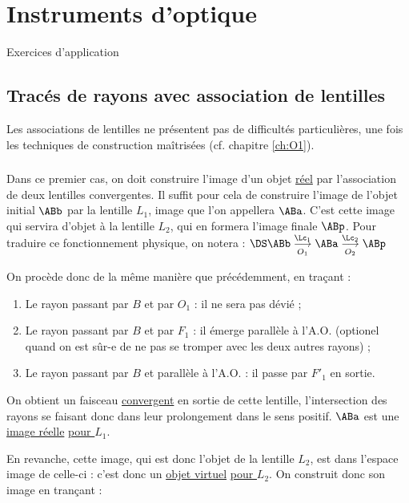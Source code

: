 \documentclass[../main/main.tex]{subfiles}
\begin{document}
\chapter{Instruments d'optique}
\vspace*{-47pt}
\begin{center}
    \Huge Exercices d'application
\end{center}
\section{Tracés de rayons avec association de lentilles}
Les associations de lentilles ne présentent pas de difficultés particulières,
une fois les techniques de construction maîtrisées (cf. chapitre \ref{ch:O1}).

\subsection{}
Dans ce premier cas, on doit construire l'image d'un objet \underline{réel} par
l'association de deux lentilles convergentes. Il suffit pour cela de construire
l'image de l'objet initial $\ABb$ par la lentille $L_1$, image que l'on appellera
$\ABa$. C'est cette image qui servira d'objet à la lentille $L_2$, qui en
formera l'image finale $\ABp$. Pour traduire ce fonctionnement physique, on
notera : $\DS \ABb \underset{O_1}{\overset{\Lc_1}{\longrightarrow}} \ABa
\underset{O_2}{\overset{\Lc_2}{\longrightarrow}}\ABp$ \bigbreak

On procède donc de la même manière que précédemment, en traçant :
\begin{enumerate}
    \item Le rayon passant par $B$ et par $O_1$ : il ne sera pas dévié ;
    \item Le rayon passant par $B$ et par $F_1$ : il émerge parallèle à
        l'A.O. (optionel quand on est sûr-e de ne pas se
        tromper avec les deux autres rayons) ;
    \item Le rayon passant par $B$ et parallèle à l'A.O. : il passe par $F'_1$
        en sortie.
\end{enumerate}

On obtient un faisceau \underline{convergent} en sortie de cette lentille,
l'intersection des rayons se faisant donc dans leur prolongement dans le sens
positif. $\ABa$ est une \underline{image réelle} \underline{\underline{pour
$L_1$}}. \bigbreak

En revanche, cette image, qui est donc l'objet de la lentille $L_2$, est dans
l'espace image de celle-ci : c'est donc un \underline{objet virtuel}
\underline{\underline{pour $L_2$}}. On construit donc son image en trançant :
\end{document}
